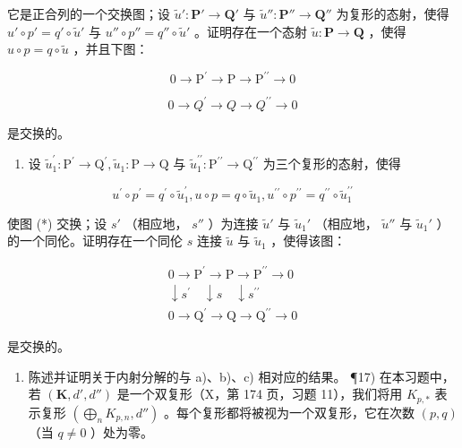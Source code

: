 它是正合列的一个交换图；设 \(\tilde{u}':\mathbf{P}'\to\mathbf{Q}'\) 与 \(\tilde{u}'':\mathbf{P}''\to\mathbf{Q}''\) 为复形的态射，使得 \(u'\circ p'=q'\circ\tilde{u}'\) 与 \(u''\circ p''=q''\circ\tilde{u}'\) 。证明存在一个态射 \(\tilde{u}:\mathbf{P}\to\mathbf{Q}\) ，使得 \(u\circ p=q\circ\tilde{u}\) ，并且下图：

\[
0 \rightarrow \mathrm{P} ^ {\prime} \rightarrow \mathrm{P} \rightarrow \mathrm{P} ^ {\prime \prime} \rightarrow 0\tag{*}
\]

\[
0 \rightarrow Q ^ {\prime} \rightarrow Q \rightarrow Q ^ {\prime \prime} \rightarrow 0
\]

是交换的。

\begin{enumerate}
\def\labelenumi{\alph{enumi})}
\setcounter{enumi}{2}
\tightlist
\item
  设 \(\tilde{u}_{1}^{\prime}: \mathrm{P}^{\prime} \to \mathrm{Q}^{\prime}, \tilde{u}_{1}: \mathrm{P} \to \mathrm{Q}\) 与 \(\tilde{u}_{1}^{\prime\prime}: \mathrm{P}^{\prime\prime} \to \mathrm{Q}^{\prime\prime}\) 为三个复形的态射，使得
\end{enumerate}

\[
u ^ {\prime} \circ p ^ {\prime} = q ^ {\prime} \circ \tilde {u} _ {1} ^ {\prime}, u \circ p = q \circ \tilde {u} _ {1}, u ^ {\prime \prime} \circ p ^ {\prime \prime} = q ^ {\prime \prime} \circ \tilde {u} _ {1} ^ {\prime \prime}
\]

使图 (*) 交换；设 \(s'\) （相应地， \(s''\) ）为连接 \(\tilde{u}'\) 与 \(\tilde{u}_{1}'\) （相应地， \(\tilde{u}''\) 与 \(\tilde{u}_{1}'\) ）的一个同伦。证明存在一个同伦 \(s\) 连接 \(\tilde{u}\) 与 \(\tilde{u}_{1}\) ，使得该图：

\[
\begin{array}{c}0 \rightarrow \mathrm{P} ^ {\prime} \rightarrow \mathrm{P} \rightarrow \mathrm{P} ^ {\prime \prime} \rightarrow 0\\\downarrow s ^ {\prime} \quad \downarrow s \quad \downarrow s ^ {\prime \prime}\\0 \rightarrow \mathrm{Q} ^ {\prime} \rightarrow \mathrm{Q} \rightarrow \mathrm{Q} ^ {\prime \prime} \rightarrow 0\end{array}
\]

是交换的。

\begin{enumerate}
\def\labelenumi{\alph{enumi})}
\setcounter{enumi}{3}
\tightlist
\item
  陈述并证明关于内射分解的与 a)、b)、c) 相对应的结果。 ¶17) 在本习题中，若 \((\mathbf{K}, d', d'')\) 是一个双复形（X，第 174 页，习题 11），我们将用 \(K_{p,*}\) 表示复形 \((\bigoplus_{n} K_{p,n}, d'')\) 。每个复形都将被视为一个双复形，它在次数 \((p, q)\) （当 \(q \neq 0\) ）处为零。
\end{enumerate}


